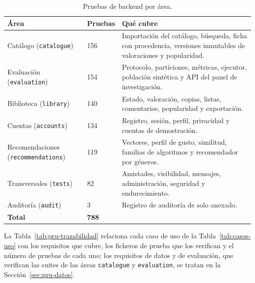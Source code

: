 \begin{table}[htp]
\centering
\begin{tabularx}{\textwidth}{ | L{0.24\textwidth} | C{0.12\textwidth} | Y | }
    \hline
    \textbf{Área} & \textbf{Pruebas} & \textbf{Qué cubre} \\
    \hline
    Catálogo (\texttt{catalogue}) & 156 & Importación del catálogo, búsqueda, ficha con procedencia, versiones inmutables de valoraciones y popularidad. \\
    \hline
    Evaluación (\texttt{evaluation}) & 154 & Protocolo, particiones, métricas, ejecutor, población sintética y API del panel de investigación. \\
    \hline
    Biblioteca (\texttt{library}) & 140 & Estado, valoración, copias, listas, comentarios, popularidad y exportación. \\
    \hline
    Cuentas (\texttt{accounts}) & 134 & Registro, sesión, perfil, privacidad y cuentas de demostración. \\
    \hline
    Recomendaciones (\texttt{recommendations}) & 119 & Vectores, perfil de gusto, similitud, familias de algoritmos y recomendador por géneros. \\
    \hline
    Transversales (\texttt{tests}) & 82 & Amistades, visibilidad, mensajes, administración, seguridad y endurecimiento. \\
    \hline
    Auditoría (\texttt{audit}) & 3 & Registro de auditoría de solo anexado. \\
    \hline
    \textbf{Total} & \textbf{788} & \\
    \hline
\end{tabularx}
\caption{Pruebas de backend por área.}
\label{tab:pru-areas}
\end{table}

La Tabla~\ref{tab:pru-trazabilidad} relaciona cada caso de uso de la Tabla~\ref{tab:casos-uso} con los requisitos que cubre, los ficheros de
prueba que los verifican y el número de pruebas de cada uno; los
requisitos de datos y de evaluación, que verifican las suites de las áreas \texttt{catalogue} y
\texttt{evaluation}, se tratan en la Sección~\ref{sec:pru-datos}.

